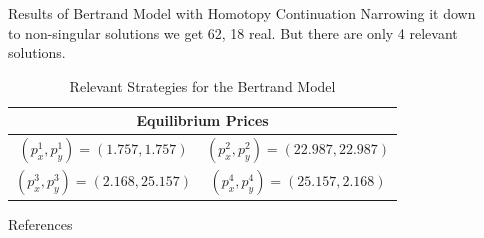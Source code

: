 \documentclass[final]{beamer}
\newlength{\sepwidth}
\newlength{\colwidth}
\newcommand{\separatorcolumn}{\begin{column}{\sepwidth}\end{column}}
\begin{document}
\begin{frame}[t]
\begin{columns}[t]
\begin{column}{\colwidth}
\begin{block}{Results of Bertrand Model with Homotopy Continuation}
    Narrowing it down to non-singular solutions we get 62, 18 real. But there are only 4 relevant solutions.
  \begin{table}[h]
      \centering
      \renewcommand{\arraystretch}{1.5} %
      \begin{tabular}{cc}
          \toprule
          \multicolumn{2}{c}{\textbf{Equilibrium Prices}} \\ 
          \midrule
          $(p^1_x, p^1_y) = (1.757, 1.757)$ & $(p^2_x, p^2_y) = (22.987, 22.987)$ \\
          $(p^3_x, p^3_y) = (2.168, 25.157)$ & $(p^4_x, p^4_y) = (25.157, 2.168)$ \\
          \bottomrule
      \end{tabular}
      \caption{Relevant Strategies for the Bertrand Model}
  \end{table}

  \end{block}

  \begin{block}{References}
    \nocite{*}

    \footnotesize
    
  \end{block}

\end{column}

\separatorcolumn
\end{columns}
\end{frame}
\end{document}
